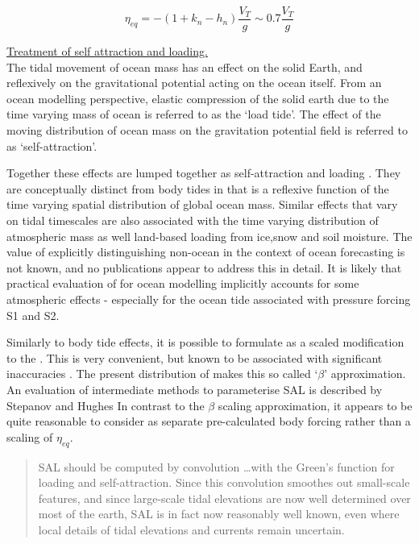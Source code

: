 \begin{equation}
\eta_{eq} = -(1+k_n-h_n) \frac{V_T}{g} \sim 0.7 \frac{V_T}{g}
\end{equation} 


\underline{Treatment of self attraction and loading.} \\
The tidal movement of ocean mass has an effect on the solid Earth, and reflexively on the gravitational potential acting on the ocean itself.
From an ocean modelling perspective, elastic compression of the solid earth due to the time varying mass of ocean is referred to as the `load tide'.  The effect of the moving distribution of ocean mass on the gravitation potential field is referred to as `self-attraction'.

Together these effects are lumped together as self-attraction and loading \SAL{}.  They are conceptually distinct from body tides in that \SAL{} is a reflexive function of the time varying spatial distribution of global ocean mass.
Similar effects that vary on tidal timescales are also associated with the time varying distribution of atmospheric mass as well land-based loading from ice,snow and soil moisture.  The value of explicitly distinguishing non-ocean \SAL{} in the context of ocean forecasting is not known, and no publications appear to address this in detail.  It is likely that practical evaluation of \SAL{} for ocean modelling implicitly accounts for some atmospheric effects - especially for the ocean tide associated with pressure forcing S1 and S2.


Similarly to body tide effects, it is possible to formulate \SAL{} as a scaled modification to the \ATGF{}.  This is very convenient, but known to be associated with significant inaccuracies \citep{Ray:1998jl}.  The present distribution of \MOM{} makes this so called `$\beta$' approximation.\\
An evaluation of intermediate methods to parameterise SAL is described by Stepanov and Hughes \cite{Stepanov:2004up}
In contrast to the $\beta$ scaling approximation, it appears to be quite reasonable to consider \SAL{} as separate pre-calculated body forcing rather than a scaling of $\eta_{eq}$. 
\begin{quotation}
SAL should be computed by convolution \dots with the Green's function for loading and self-attraction. Since this convolution smoothes out small-scale features, and since large-scale tidal elevations are now well determined over most	of the earth, SAL is in fact now reasonably well known, even where local details of tidal elevations and currents remain uncertain. \citep{Egbert:2002ug}
\end{quotation}


